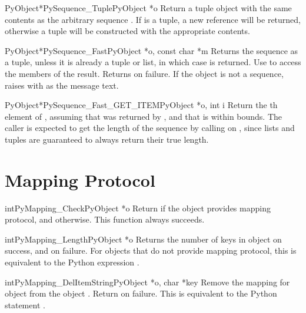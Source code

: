 \documentclass{manual}
\begin{document}
\begin{cfuncdesc}{PyObject*}{PySequence_Tuple}{PyObject *o}
Return a tuple object with the same contents as the arbitrary sequence
.  If  is a tuple, a new reference will be returned,
otherwise a tuple will be constructed with the appropriate contents.
\end{cfuncdesc}


\begin{cfuncdesc}{PyObject*}{PySequence_Fast}{PyObject *o, const char *m}
Returns the sequence  as a tuple, unless it is already a
tuple or list, in which case  is returned.  Use
 to access the members of the
result.  Returns \NULL{} on failure.  If the object is not a sequence,
raises  with  as the message text.
\end{cfuncdesc}

\begin{cfuncdesc}{PyObject*}{PySequence_Fast_GET_ITEM}{PyObject *o, int i}
Return the th element of , assuming that  was
returned by , and that  is within
bounds.  The caller is expected to get the length of the sequence by
calling  on , since lists and tuples
are guaranteed to always return their true length.
\end{cfuncdesc}


\section{Mapping Protocol \label{mapping}}

\begin{cfuncdesc}{int}{PyMapping_Check}{PyObject *o}
Return  if the object provides mapping protocol, and
 otherwise.  This function always succeeds.
\end{cfuncdesc}


\begin{cfuncdesc}{int}{PyMapping_Length}{PyObject *o}
Returns the number of keys in object  on success, and
 on failure.  For objects that do not provide mapping
protocol, this is equivalent to the Python expression
.
\end{cfuncdesc}


\begin{cfuncdesc}{int}{PyMapping_DelItemString}{PyObject *o, char *key}
Remove the mapping for object  from the object .
Return  on failure.  This is equivalent to
the Python statement .
\end{cfuncdesc}
\end{document}
